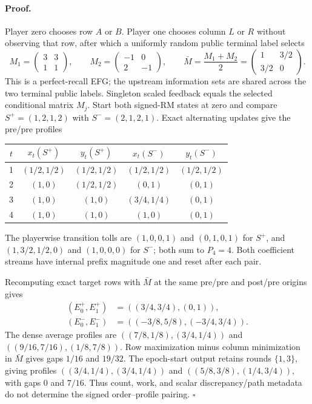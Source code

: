 \paragraph{Proof.}
Player zero chooses row $A$ or $B$.  Player one chooses column $L$ or $R$
without observing that row, after which a uniformly random public terminal
label selects
\begin{equation}
M_1=\begin{pmatrix}3&3\\1&1\end{pmatrix},\qquad
M_2=\begin{pmatrix}-1&0\\2&-1\end{pmatrix},\qquad
\bar M=\frac{M_1+M_2}{2}
=\begin{pmatrix}1&3/2\\3/2&0\end{pmatrix}.
\label{eq:app-order-matrices}
\end{equation}
This is a perfect-recall EFG; the upstream information sets are shared across
the two terminal public labels.  Singleton scaled feedback equals the selected
conditional matrix $M_j$.  Start both signed-RM states at zero and
compare $S^+=(1,2,1,2)$ with $S^-=(2,1,2,1)$.  Exact alternating updates give
the pre/pre profiles
\begin{center}
\small
\begin{tabular}{@{}c@{\quad}cc@{\qquad}cc@{}}
\toprule
$t$ & $x_t(S^+)$ & $y_t(S^+)$ & $x_t(S^-)$ & $y_t(S^-)$\\
\midrule
1 & $(1/2,1/2)$ & $(1/2,1/2)$ & $(1/2,1/2)$ & $(1/2,1/2)$\\
2 & $(1,0)$     & $(1/2,1/2)$ & $(0,1)$     & $(0,1)$\\
3 & $(1,0)$     & $(1,0)$     & $(3/4,1/4)$ & $(0,1)$\\
4 & $(1,0)$     & $(1,0)$     & $(1,0)$     & $(0,1)$\\
\bottomrule
\end{tabular}
\end{center}
The playerwise transition tolls are $(1,0,0,1)$ and $(0,1,0,1)$ for $S^+$,
and $(1,3/2,1/2,0)$ and $(1,0,0,0)$ for $S^-$; both sum to $P_4=4$.
Both coefficient streams have internal prefix magnitude one and reset after
each pair.

Recomputing exact target rows with $\bar M$ at the same pre/pre and post/pre
origins gives
\begin{align}
(E_0^+,E_1^+)&=((3/4,3/4),(0,1)),\\
(E_0^-,E_1^-)&=((-3/8,5/8),(-3/4,3/4)).
\end{align}
The dense average profiles are
$((7/8,1/8),(3/4,1/4))$ and
$((9/16,7/16),(1/8,7/8))$.  Row maximization minus column minimization in
$\bar M$ gives gaps $1/16$ and $19/32$.  The epoch-start output retains
rounds $\{1,3\}$, giving
profiles $((3/4,1/4),(3/4,1/4))$ and
$((5/8,3/8),(1/4,3/4))$, with gaps $0$ and $7/16$.
Thus count, work, and scalar discrepancy/path metadata do not determine the
signed order--profile pairing. \hfill$\square$

